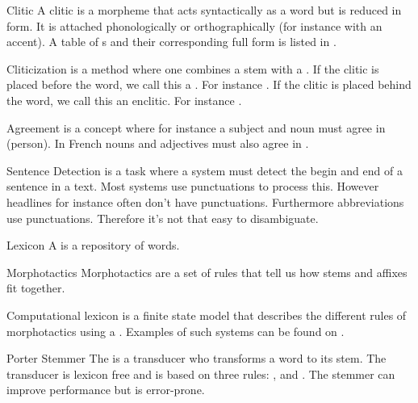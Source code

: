 \begin{df}{Clitic}
A clitic is a morpheme that acts syntactically as a word but is reduced in form. It is attached phonologically or orthographically (for instance with an accent). A table of \sb{}s and their corresponding full form is listed in .
\end{df}
\begin{df}{Cliticization}
\sb{} is a method where one combines a stem with a . If the clitic is placed before the word, we call this a . For instance . If the clitic is placed behind the word, we call this an enclitic. For instance .
\end{df}
\begin{df}{Agreement}
\sb{} is a concept where for instance a subject and noun must agree in  (person). In French nouns and adjectives must also agree in .
\end{df}
\begin{df}{Sentence Detection}
\sb{} is a task where a system must detect the begin and end of a sentence in a text. Most systems use punctuations to process this. However headlines for instance often don't have punctuations. Furthermore abbreviations use punctuations. Therefore it's not that easy to disambiguate.
\end{df}
\begin{df}{Lexicon}
A \sb{} is a repository of words.
\end{df}
\begin{df}{Morphotactics}
Morphotactics are a set of rules that tell us how stems and affixes fit together.
\end{df}
\begin{df}{Computational lexicon}
\sb{} is a finite state model that describes the different rules of morphotactics using a . Examples of such systems can be found on .
\end{df}
\begin{df}{Porter Stemmer}
The \sb{} is a transducer who transforms a word to its stem. The transducer is lexicon free and is based on three rules: ,  and . The stemmer can improve performance but is error-prone.
\end{df}
